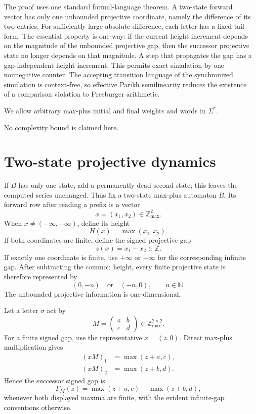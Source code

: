 \documentclass[11pt]{article}
\newcommand{\Zmax}{\mathbb{Z}_{\max}}
\newcommand{\minf}{-\infty}
\begin{document}
The proof uses one standard formal-language theorem. A two-state forward vector has only one unbounded projective coordinate, namely the difference of its two entries. For sufficiently large absolute difference, each letter has a fixed tail form. The essential property is one-way: if the current height increment depends on the magnitude of the unbounded projective gap, then the successor projective state no longer depends on that magnitude. A step that propagates the gap has a gap-independent height increment. This permits exact simulation by one nonnegative counter. The accepting transition language of the synchronized simulation is context-free, so effective Parikh semilinearity \cite{Parikh1966,KopczynskiTo2010} reduces the existence of a comparison violation to Presburger arithmetic.

We allow arbitrary max-plus initial and final weights and words in $\Sigma^*$.

No complexity bound is claimed here.

\section{Two-state projective dynamics}

If $B$ has only one state, add a permanently dead second state; this leaves the computed series unchanged. Thus fix a two-state max-plus automaton $B$. Its forward row after reading a prefix is a vector
\[
x=(x_1,x_2)\in\Zmax^2.
\]
When $x\neq(\minf,\minf)$, define its height
\[
H(x)=\max(x_1,x_2).
\]
If both coordinates are finite, define the signed projective gap
\[
z(x)=x_1-x_2\in\mathbb Z.
\]
If exactly one coordinate is finite, use $+\infty$ or $-\infty$ for the corresponding infinite gap. After subtracting the common height, every finite projective state is therefore represented by
\[
(0,-n)\quad\text{or}\quad(-n,0),\qquad n\in\mathbb N.
\]
The unbounded projective information is one-dimensional.

Let a letter $\sigma$ act by
\[
M=\begin{pmatrix}a&b\\c&d\end{pmatrix}\in\Zmax^{2\times2}.
\]
For a finite signed gap, use the representative $x=(z,0)$. Direct max-plus multiplication gives
\begin{align}
(xM)_1&=\max(z+a,c),\\
(xM)_2&=\max(z+b,d).
\end{align}
Hence the successor signed gap is
\begin{equation}\label{eq:gap}
F_M(z)=\max(z+a,c)-\max(z+b,d),
\end{equation}
whenever both displayed maxima are finite, with the evident infinite-gap conventions otherwise.
\end{document}
